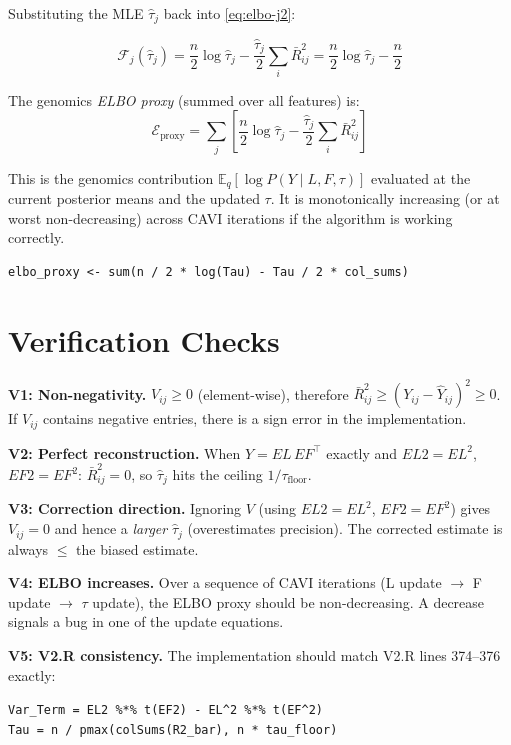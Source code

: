 \documentclass[11pt]{article}
\begin{document}
Substituting the MLE $\hat{\tau}_j$ back into \eqref{eq:elbo-j2}:

\begin{equation}
  \mathcal{F}_j(\hat{\tau}_j)
  = \frac{n}{2}\log\hat{\tau}_j
  - \frac{\hat{\tau}_j}{2}\sum_i\bar{R}^2_{ij}
  = \frac{n}{2}\log\hat{\tau}_j - \frac{n}{2}
  \label{eq:elbo-at-mle}
\end{equation}

The genomics \emph{ELBO proxy} (summed over all features) is:
\begin{equation}
  \boxed{\mathcal{E}_{\text{proxy}} = \sum_j\left[\frac{n}{2}\log\hat{\tau}_j
  - \frac{\hat{\tau}_j}{2}\sum_i\bar{R}^2_{ij}\right]}
  \label{eq:elbo-proxy}
\end{equation}

This is the genomics contribution $\mathbb{E}_q[\log P(Y \mid L, F, \tau)]$
evaluated at the current posterior means and the updated $\tau$.  It is
monotonically increasing (or at worst non-decreasing) across CAVI iterations
if the algorithm is working correctly.

\begin{codebox}
\begin{verbatim}
elbo_proxy <- sum(n / 2 * log(Tau) - Tau / 2 * col_sums)
\end{verbatim}
\end{codebox}

\section{Verification Checks}\label{sec:verification}

\begin{verifybox}
\textbf{V1: Non-negativity.}
$V_{ij} \geq 0$ (element-wise), therefore $\bar{R}^2_{ij} \geq (Y_{ij} -
\hat{Y}_{ij})^2 \geq 0$.  If $V_{ij}$ contains negative entries, there is a
sign error in the implementation.

\textbf{V2: Perfect reconstruction.}
When $Y = EL\,EF^\top$ exactly and $EL2 = EL^2$, $EF2 = EF^2$:
$\bar{R}^2_{ij} = 0$, so $\hat{\tau}_j$ hits the ceiling $1/\tau_{\text{floor}}$.

\textbf{V3: Correction direction.}
Ignoring $V$ (using $EL2 = EL^2$, $EF2 = EF^2$) gives $V_{ij} = 0$ and
hence a \emph{larger} $\hat{\tau}_j$ (overestimates precision).  The
corrected estimate is always $\leq$ the biased estimate.

\textbf{V4: ELBO increases.}
Over a sequence of CAVI iterations (L update $\to$ F update $\to$ $\tau$
update), the ELBO proxy should be non-decreasing.  A decrease signals a bug
in one of the update equations.

\textbf{V5: V2.R consistency.}
The implementation should match V2.R lines 374--376 exactly:
\begin{center}
\texttt{Var\_Term = EL2 \%*\% t(EF2) - EL\^{}2 \%*\% t(EF\^{}2)}\\
\texttt{Tau = n / pmax(colSums(R2\_bar), n * tau\_floor)}
\end{center}
\end{verifybox}
\end{document}
